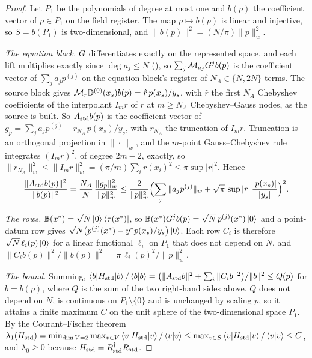 \begin{proof}
Let $P_1$ be the polynomials of degree at most one and $b(p)$ the coefficient vector of $p\in P_1$ on the field register. The map $p\mapsto b(p)$ is linear and injective, so $S=b(P_1)$ is two-dimensional, and $\|b(p)\|^2=(N/\pi)\|p\|_w^2$.

\emph{The equation block.} $G$ differentiates exactly on the represented space, and each lift multiplies exactly since $\deg a_j\le N$ (), so $\sum_j\mathcal{M}_{a_j}G^jb(p)$ is the coefficient vector of $\sum_ja_jp^{(j)}$ on the equation block's register of $N_A\in\{N,2N\}$ terms. The source block gives $\mathcal{M}_r\mathbb{D}^{(0)}(x_s)b(p)=\hat r\,p(x_s)/y_s$, with $\hat r$ the first $N_A$ Chebyshev coefficients of the interpolant $I_mr$ of $r$ at $m\ge N_A$ Chebyshev--Gauss nodes, as the source is built. So $A_{\mathrm{std}} b(p)$ is the coefficient vector of $g_p=\sum_ja_jp^{(j)}-r_{N_A}\,p(x_s)/y_s$, with $r_{N_A}$ the truncation of $I_mr$. Truncation is an orthogonal projection in $\|\cdot\|_w$, and the $m$-point Gauss--Chebyshev rule integrates $(I_mr)^2$, of degree $2m-2$, exactly, so $\|r_{N_A}\|_w^2\le\|I_mr\|_w^2=(\pi/m)\sum_{i}r(x_i)^2\le\pi\sup|r|^2$. Hence
\begin{equation*}
    \frac{\|A_{\mathrm{std}} b(p)\|^2}{\|b(p)\|^2}=\frac{N_A}{N}\,\frac{\|g_p\|_w^2}{\|p\|_w^2}\le\frac{2}{\|p\|_w^2}\Bigl(\sum_j\|a_jp^{(j)}\|_w+\sqrt\pi\,\sup|r|\,\frac{|p(x_s)|}{|y_s|}\Bigr)^2 .
\end{equation*}

\emph{The rows.} $\mathbb{B}(x^*)=\sqrt N\ket0\bra{\tau(x^*)}$, so $\mathbb{B}(x^*)G^jb(p)=\sqrt N\,p^{(j)}(x^*)\ket0$ and a point-datum row gives $\sqrt N\bigl(p^{(j)}(x^*)-y^*p(x_s)/y_s\bigr)\ket0$. Each row $C_i$ is therefore $\sqrt N\,\ell_i(p)\ket0$ for a linear functional $\ell_i$ on $P_1$ that does not depend on $N$, and $\|C_ib(p)\|^2/\|b(p)\|^2=\pi\,\ell_i(p)^2/\|p\|_w^2$.

\emph{The bound.} Summing, $\braket{b|H_{\mathrm{std}}|b}/\braket{b|b}=\bigl(\|A_{\mathrm{std}} b\|^2+\sum_i\|C_ib\|^2\bigr)/\|b\|^2\le Q(p)$ for $b=b(p)$, where $Q$ is the sum of the two right-hand sides above. $Q$ does not depend on $N$, is continuous on $P_1\setminus\{0\}$ and is unchanged by scaling $p$, so it attains a finite maximum $C$ on the unit sphere of the two-dimensional space $P_1$. By the Courant--Fischer theorem $\lambda_1(H_{\mathrm{std}})=\min_{\dim V=2}\max_{v\in V}\braket{v|H_{\mathrm{std}}|v}/\braket{v|v}\le\max_{v\in S}\braket{v|H_{\mathrm{std}}|v}/\braket{v|v}\le C$, and $\lambda_0\ge0$ because $H_{\mathrm{std}}=R_{\mathrm{std}}^\dagger R_{\mathrm{std}}$.


\end{proof}
